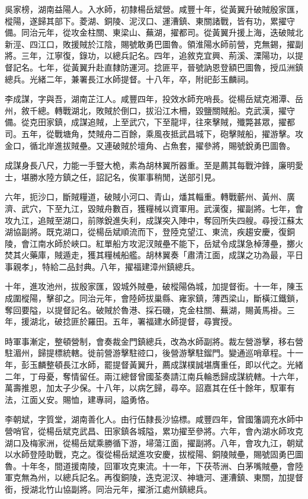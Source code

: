 \begin{pinyinscope}
吳家榜，湖南益陽人。入水師，初隸楊岳斌營。咸豐十年，從黃翼升破賊殷家匯，樅陽，遂歸其部下。菱湖、銅陵、泥汊口、運漕鎮、東關諸戰，皆有功，累擢守備。同治元年，從攻金柱關、東梁山、蕪湖，擢都司。從黃翼升援上海，迭破賊北新涇、四江口，敗援賊於江陰，賜號敢勇巴圖魯。領淮陽水師前營，克無錫，擢副將。三年，江寧復，錄功，以總兵記名。四年，追敘克宜興、荊溪、溧陽功，以提督記名。七年，從黃翼升赴直隸防運河。捻匪平，晉號訥恩登額巴圖魯，授瓜洲鎮總兵。光緒二年，兼署長江水師提督。十八年，卒，附祀彭玉麟祠。

李成謀，字與吾，湖南芷江人。咸豐四年，投效水師充哨長。從楊岳斌克湘潭、岳州，敘千總。轉戰湖北，敗賊於倒口，拔沿江木柵，毀鹽關賊船。克武漢，擢守備。從克田家鎮，成謀追賊，上至武穴，下至龍坪，往來擊賊，殲斃甚眾，擢都司。五年，從戰塘角，焚賊舟二百餘，乘風夜抵武昌城下，砲擊賊船，擢游擊。攻金口，循北岸進拔賊壘。又連破賊於壇角、占魚套，擢參將，賜號銳勇巴圖魯。

成謀身長八尺，力能一手豎大桅，素為胡林翼所器重。至是薦其每戰沖鋒，廉明愛士，堪勝水陸方鎮之任，詔記名，俟軍事稍閒，送部引見。

六年，扼沙口，斷賊糧道，破賊小河口、青山，燔其輜重。轉戰蘄州、黃州、廣濟、武穴，下至九江，毀賊舟數百，獲糧械以資軍用。武漢復，擢副將。七年，會攻九江，追賊至湖口，前隊銳進失利，成謀突入陣中，奪回所失四艘。尋授江蘇太湖協副將。既克湖口，從楊岳斌順流而下，登陸克望江、東流，疾趨安慶，復銅陵，會江南水師於峽口。紅單船方攻泥汊賊壘不能下，岳斌令成謀急棹薄壘，擲火焚其火藥庫，賊遁走，獲其糧械船艦。胡林翼奏「肅清江面，成謀之功為最，平日事親孝」，特給二品封典。八年，擢福建漳州鎮總兵。

十年，進攻池州，拔殷家匯，毀城外賊壘，破樅陽偽城，加提督銜。十一年，陳玉成圍樅陽，擊卻之。同治元年，會陸師拔巢縣、雍家鎮，薄西梁山，斷橫江鐵鎖，奪回要隘，以提督記名。破賊於魯港、採石磯，克金柱關、蕪湖，賜黃馬褂。三年，援湖北，破捻匪於羅田。五年，署福建水師提督，尋實授。

時軍事漸定，整頓營制，會奏裁金門鎮總兵，改為水師副將。裁左營游擊，移右營駐湄州，歸提標統轄。徙前營游擊駐谾口，後營游擊駐鎦門。變通巡哨章程。十一年，彭玉麟整頓長江水師，罷提督黃翼升，薦成謀樸誠堪膺重任，即以代之。光緒二年，丁母憂，奪情留任。兩江總督曾國荃奏請江南兵輪悉歸成謀統轄。十六年，萬壽推恩，加太子少保。十八年，以病乞歸，尋卒。詔嘉其在任十餘年，馭軍有法，江面乂安。賜恤，建專祠，謚勇恪。

李朝斌，字質堂，湖南善化人。由行伍隸長沙協標。咸豐四年，曾國籓調充水師中營哨官，從楊岳斌克武昌、田家鎮各城隘，累功擢至參將。六年，會內湖水師攻克湖口及梅家洲，從楊岳斌乘勝循下游，埽蕩江面，擢副將。八年，會攻九江，朝斌以水師登陸助戰，克之。復從楊岳斌進攻安慶，拔樅陽、銅陵賊壘，賜號固勇巴圖魯。十年冬，間道援南陵，回軍攻克東流。十一年，下茯苓洲、白茅嘴賊壘，會陸軍克無為州，以總兵記名。再復銅陵，迭克泥汊、神塘河、運漕鎮、東關，加提督銜，授湖北竹山協副將。同治元年，擢浙江處州鎮總兵。


\end{pinyinscope}
